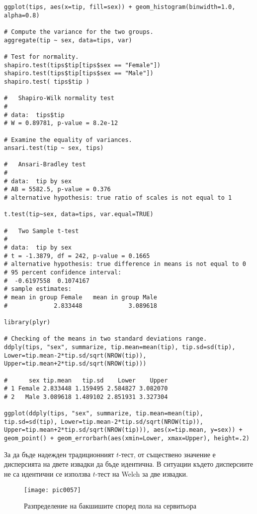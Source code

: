 \begin{lstlisting}[caption=Сравнение на две извадки, label=listing0171]
ggplot(tips, aes(x=tip, fill=sex)) + geom_histogram(binwidth=1.0, alpha=0.8)

# Compute the variance for the two groups.
aggregate(tip ~ sex, data=tips, var)

# Test for normality.
shapiro.test(tips$tip[tips$sex == "Female"])
shapiro.test(tips$tip[tips$sex == "Male"])
shapiro.test( tips$tip )

# 	Shapiro-Wilk normality test
# 
# data:  tips$tip
# W = 0.89781, p-value = 8.2e-12

# Examine the equality of variances.
ansari.test(tip ~ sex, tips)

# 	Ansari-Bradley test
# 
# data:  tip by sex
# AB = 5582.5, p-value = 0.376
# alternative hypothesis: true ratio of scales is not equal to 1

t.test(tip~sex, data=tips, var.equal=TRUE)

# 	Two Sample t-test
# 
# data:  tip by sex
# t = -1.3879, df = 242, p-value = 0.1665
# alternative hypothesis: true difference in means is not equal to 0
# 95 percent confidence interval:
#  -0.6197558  0.1074167
# sample estimates:
# mean in group Female   mean in group Male 
#             2.833448             3.089618

library(plyr)

# Checking of the means in two standard deviations range.
ddply(tips, "sex", summarize, tip.mean=mean(tip), tip.sd=sd(tip), Lower=tip.mean-2*tip.sd/sqrt(NROW(tip)), Upper=tip.mean+2*tip.sd/sqrt(NROW(tip))) 

#      sex tip.mean   tip.sd    Lower    Upper
# 1 Female 2.833448 1.159495 2.584827 3.082070
# 2   Male 3.089618 1.489102 2.851931 3.327304

ggplot(ddply(tips, "sex", summarize, tip.mean=mean(tip), tip.sd=sd(tip), Lower=tip.mean-2*tip.sd/sqrt(NROW(tip)), Upper=tip.mean+2*tip.sd/sqrt(NROW(tip))), aes(x=tip.mean, y=sex)) + geom_point() + geom_errorbarh(aes(xmin=Lower, xmax=Upper), height=.2)
\end{lstlisting}

За да бъде надежден традиционният $t$-тест, от съществено значение е дисперсията на двете извадки да бъде идентична. В ситуации където дисперсиите не са идентични се използва $t$-тест на Welch за две извадки. 

\begin{figure}[h!]
  \centering
  \texttt{[image: pic0057]}
  \caption{Разпределение на бакшишите според пола на сервитьора}
\label{figure0057}
\end{figure}
\FloatBarrier

